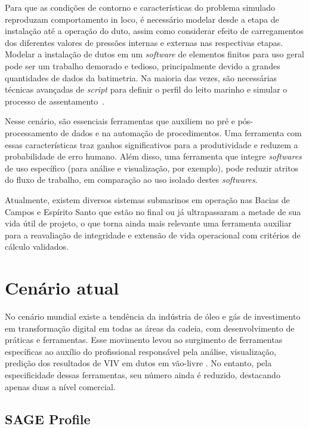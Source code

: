 Para que as condições de contorno e características do problema simulado reproduzam comportamento in loco, é necessário modelar desde a etapa de instalação até a operação do duto, assim como considerar efeito de carregamentos dos diferentes valores de pressões internas e externas nas respectivas etapas.
Modelar a instalação de dutos em um \textit{software} de elementos finitos para uso geral pode ser um trabalho demorado e tedioso, principalmente devido a grandes quantidades de dados da batimetria.
Na maioria das vezes, são necessárias técnicas avançadas de \textit{script} para definir o perfil do leito marinho e simular o processo de assentamento~\cite{VandenAbeele2013}.

Nesse cenário, são essenciais ferramentas que auxiliem no pré e pós-processamento de dados e na automação de procedimentos.
Uma ferramenta com essas características traz ganhos significativos para a produtividade e reduzem a probabilidade de erro humano.
Além disso, uma ferramenta que integre \textit{softwares} de uso específico (para análise e visualização, por exemplo), pode reduzir atritos do fluxo de trabalho, em comparação ao uso isolado destes \textit{softwares}.

Atualmente, existem diversos sistemas submarinos em operação nas Bacias de Campos e Espírito Santo que estão no final ou já ultrapassaram a metade de sua vida útil de projeto, o que torna ainda mais relevante uma ferramenta auxiliar para a reavaliação de integridade e extensão de vida operacional com critérios de cálculo validados.


\section{Cenário atual}


No cenário mundial existe a tendência da indústria de óleo e gás de investimento em transformação digital em todas as áreas da cadeia, com desenvolvimento de práticas e ferramentas. Esse movimento levou ao surgimento de ferramentas específicas ao auxílio do profissional responsável pela análise, visualização, predição dos resultados de VIV em dutos em vão-livre \cite{Mittal2017}. No entanto, pela especificidade dessas ferramentas, seu número ainda é reduzido, destacando apenas duas a nível comercial.


\subsection{SAGE Profile}


